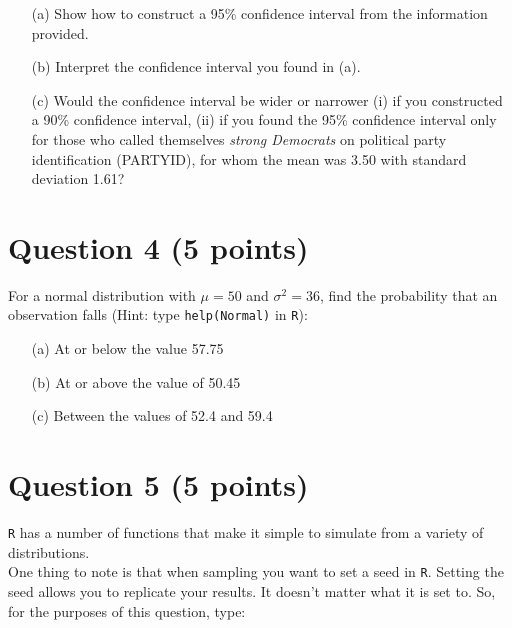 \documentclass[12pt,letterpaper]{article}
\begin{document}
\begin{itemize}

\item[(a)] Show how to construct a 95\% confidence interval from the information provided.\\

\item[(b)] Interpret the confidence interval you found in (a).\\

\item[(c)] Would the confidence interval be wider or narrower (i) if you constructed a 90\% confidence interval, (ii) if you found the 95\% confidence interval only for those who called themselves \textit{strong Democrats} on political party identification (PARTYID), for whom the mean was 3.50 with standard deviation 1.61?\\

\end{itemize}

\section*{Question 4 (5 points)}
For a normal distribution with $\mu = 50$ and $\sigma^2 = 36$, find the probability that an observation falls (Hint: type \texttt{help(Normal)} in \texttt{R}):

\begin{itemize}
\item[(a)] At or below the value 57.75 \\
\item[(b)] At or above the value of  50.45 \\

\item[(c)] Between the values of 52.4 and 59.4 \\



\end{itemize}
\section*{Question 5 (5 points)}

\texttt{R} has a number of functions that make it simple to simulate from a variety of distributions.\\

\noindent One thing to note is that when sampling you want to set a seed in \texttt{R}.  Setting the seed allows you to replicate your results.  It doesn't matter what it is set to.  So, for the purposes of this question, type:\\
\end{document}
